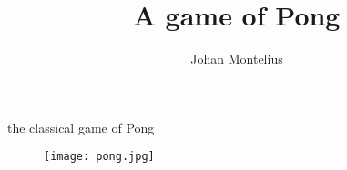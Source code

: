 

\usepackage{pgf-umlsd}

\title[ID1019 A transport layer]{A game of Pong}


\author{Johan Montelius}
\date{\semester}



\begin{frame}
\titlepage
\end{frame}

\begin{frame}{the classical game of Pong}

  \begin{figure}
    \texttt{[image: pong.jpg]}
  \end{figure}
  
\end{frame}

